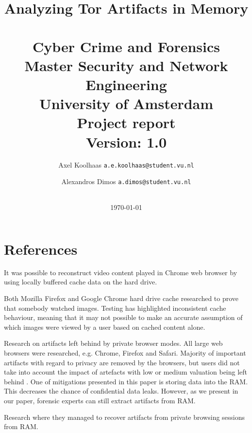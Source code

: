 \documentclass[a4paper,11pt]{article}
\begin{document}
\title{Analyzing Tor Artifacts in Memory \\~\\
\large{Cyber Crime and Forensics \\
Master Security and Network Engineering\\  University of Amsterdam\\
Project report\\}
\textbf{Version:} 1.0}
\author{
    Axel Koolhaas \texttt{a.e.koolhaas@student.vu.nl} \and
    Alexandros Dimos \texttt{a.dimos@student.vu.nl}\\
    \\
}
\date{
    \textnormal \today
}
\maketitle

\clearpage


\clearpage

\tableofcontents
\clearpage

\section{References}
It was possible to reconstruct video content played in Chrome web browser by using
locally buffered cache data on the hard drive.
\cite{horsman2018reconstructing}

Both Mozilla Firefox and Google Chrome hard drive cache researched to
prove that somebody watched images. Testing has highlighted inconsistent cache
behaviour, meaning that it may not possible to make an accurate
assumption of which images were viewed by a user based on cached
content alone.
\cite{horsman2018didn}

Research on artifacts left behind by private browser modes. All large
web browsers were researched, e.g. Chrome, Firefox and
Safari. Majority of important artifacts with regard to privacy are
removed by the browsers, but users did not take into account the
impact of artefacts with low or medium valuation being left behind
\cite{tsalis2017exploring}. One of mitigations presented in this paper
is storing data into the RAM. This decreases the chance of
confidential data leaks. However, as we present in our paper, forensic
experts can still extract artifacts from RAM.

Research where they managed to recover artifacts from private browsing
sessions from RAM. \cite{yang2017applying}







\printbibliography
\end{document}
